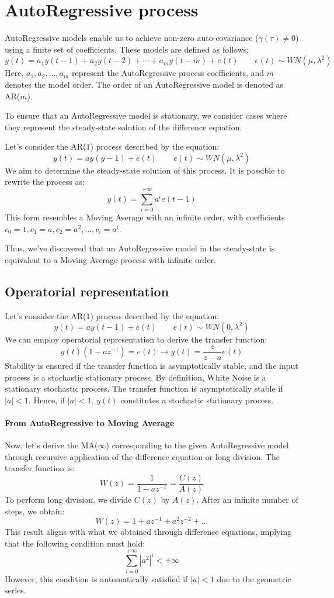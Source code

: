 \section{AutoRegressive process}

AutoRegressive models enable us to achieve non-zero auto-covariance ($\gamma(\tau)\neq 0$) using a finite set of coefficients. 
These models are defined as follows:
\[y(t)=a_1y(t-1)+a_2y(t-2)+\cdots+a_m y(t-m)+e(t) \qquad e(t)\sim WN(\mu,\lambda^2)\]
Here, $a_1,a_2,\dots,a_m$ represent the AutoRegressive process coefficients, and $m$ denotes the model order. 
The order of an AutoRegressive model is denoted as AR($m$).

To ensure that an AutoRegressive model is stationary, we consider cases where they represent the steady-state solution of the difference equation.
\begin{example}
    Let's consider the AR($1$) process described by the equation:
    \[y(t)=ay(y-1)+e(t)\qquad e(t) \sim WN(\mu,\lambda^2)\]
    We aim to determine the steady-state solution of this process. 
    It is possible to rewrite the process as:
    \[y(t)=\sum_{i=0}^{+\infty}a^i e(t-1)\]
    This form resembles a Moving Average with an infinite order, with coefficients  $c_0=1,c_1=a,c_2=a^2,\dots,c_i=a^i$. 
\end{example}
Thus, we've discovered that an AutoRegressive model in the steady-state is equivalent to a Moving Average process with infinite order.

\subsection{Operatorial representation}
Let's consider the AR($1$) process described by the equation:
\[y(t)=ay(t-1)+e(t) \qquad e(t)\sim WN(0,\lambda^2)\]
We can employ operatorial representation to derive the transfer function:
\[y(t)\left( 1 -az^{-1} \right)=e(t) \rightarrow y(t)=\dfrac{z}{z-a}e(t)\]
Stability is ensured if the transfer function is asymptotically stable, and the input process is a stochastic stationary process.
By definition,  White Noise is a stationary stochastic process. 
The transfer function is asymptotically stable if $\left\lvert a \right\rvert<1$.
Hence, if $\left\lvert a \right\rvert<1$, $y(t)$ constitutes a stochastic stationary process.
\paragraph*{From AutoRegressive to Moving Average}
Now, let's derive the MA($\infty$) corresponding to the given AutoRegressive model through recursive application of the difference equation or long division. 
The transfer function is:
\[W(z)=\dfrac{1}{1-az^{-1}}=\dfrac{C(z)}{A(z)}\]
To perform long division, we divide $C(z)$ by $A(z)$. 
After an infinite number of steps, we obtain:
\[W(z)=1+az^{-1}+a^2z^{-2}+\dots\]
This result aligns with what we obtained through difference equations, implying that the following condition must hold:
\[\sum_{i=0}^{+\infty} \left\lvert a^2 \right\rvert^i<+\infty \]
However, this condition is automatically satisfied if $\left\lvert a \right\rvert<1$ due to the geometric series.

